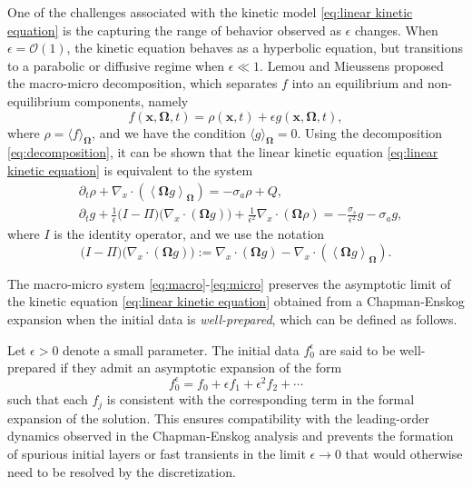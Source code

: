 \documentclass[onefignum,onetabnum]{siamart220329}
\begin{document}
One of the challenges associated with the kinetic model \eqref{eq:linear kinetic equation} is the capturing the range of behavior observed as $\epsilon$ changes. When $\epsilon = \mathcal{O}(1)$, the kinetic equation behaves as a hyperbolic equation, but transitions to a parabolic or diffusive regime when $\epsilon \ll 1$. Lemou and Mieussens \cite{Lemou-Mieussens2008} proposed the macro-micro decomposition, which separates $f$ into an equilibrium and non-equilibrium components, namely
\begin{equation}
    f \left(\mathbf{x}, \mathbf{\Omega},t \right) = \rho \left(\mathbf{x},t \right) + \epsilon g \left(\mathbf{x}, \mathbf{\Omega},t\right), \label{eq:decomposition}
\end{equation}
where $\rho = \langle f \rangle_{\mathbf{\Omega}}$, and we have the condition $\langle g \rangle_{\mathbf{\Omega}} = 0$. Using the decomposition \eqref{eq:decomposition}, it can be shown that the linear kinetic equation \eqref{eq:linear kinetic equation} is equivalent to the system
\begin{align}
    &\partial_{t} \rho + \nabla_{x} \cdot \left( \left\langle \mathbf{\Omega} g \right\rangle_{\mathbf{\Omega}} \right) = - \sigma_{a} \rho + Q, \label{eq:macro} \\
    &\partial_{t} g + \frac{1}{\epsilon} \Big( I - \Pi \Big) \Big( \nabla_{x} \cdot \left(  \mathbf{\Omega} g \right) \Big) + \frac{1}{\epsilon^{2}}\nabla_{x} \cdot \left( \mathbf{\Omega} \rho \right) = -\frac{\sigma_{s}}{\epsilon^{2}} g - \sigma_{a} g, \label{eq:micro}
\end{align}
where $I$ is the identity operator, and we use the notation
\begin{equation*}
    \Big( I - \Pi \Big) \Big( \nabla_{x} \cdot \left(  \mathbf{\Omega} g \right) \Big) := \nabla_{x} \cdot \left(  \mathbf{\Omega} g \right) - \nabla_{x} \cdot \left( \left\langle  \mathbf{\Omega} g \right\rangle_{\mathbf{\Omega}} \right).
\end{equation*}


The macro-micro system \eqref{eq:macro}-\eqref{eq:micro} preserves the asymptotic limit of the kinetic equation \eqref{eq:linear kinetic equation} obtained from a Chapman-Enskog expansion \cite{Lemou-Mieussens2008} when the initial data is \textit{well-prepared}, which can be defined as follows.
\begin{definition}
Let $\epsilon > 0$ denote a small parameter. The initial data $f_{0}^{\epsilon}$ are said to be well-prepared if they admit an asymptotic expansion of the form
\begin{equation*}
    f_{0}^{\epsilon} = f_{0} + \epsilon f_{1} + \epsilon^2 f_{2} + \cdots
\end{equation*}
such that each $f_{j}$ is consistent with the corresponding term in the formal expansion of the solution. This ensures compatibility with the leading-order dynamics observed in the Chapman-Enskog analysis and prevents the formation of spurious initial layers or fast transients in the limit $\epsilon \rightarrow 0$ that would otherwise need to be resolved by the discretization.
\end{definition}
\end{document}
